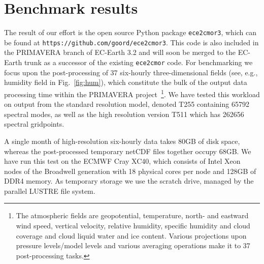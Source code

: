 \documentclass[procedia]{easychair}
\begin{document}
\section{Benchmark results}
The result of our effort is the open source Python package \texttt{ece2cmor3}, 
which can be found at \texttt{https://github.com/goord/ece2cmor3}. This code is 
also included in the PRIMAVERA branch of EC-Earth 3.2 and will soon be merged 
to the EC-Earth trunk as a successor of the existing \texttt{ece2cmor} code. 
For benchmarking we focus upon the post-processing of 37 six-hourly 
three-dimensional fields (see, e.g., humidity field in Fig.~\ref{fig:hum}), 
which constitute the bulk of the output data 
processing time within the PRIMAVERA project~\footnote{The atmospheric fields 
are geopotential, temperature, north- and eastward wind speed, vertical 
velocity, relative humidity, specific humidity and cloud coverage and cloud 
liquid water and ice content. Various projections upon pressure levels/model 
levels and various averaging operations make it to 37 post-processing tasks.}. 
We have tested this workload on output from the standard resolution model, 
denoted T255 containing 65792 spectral modes, as well as the high resolution 
version T511 which has 262656 spectral gridpoints.
  
A single month of high-resolution six-hourly data takes 80GB of disk space, 
whereas the post-processed temporary netCDF files together occupy 68GB. We have 
run this test on the ECMWF Cray XC40, which consists of Intel Xeon nodes of the 
Broadwell generation with 18 physical cores per node and 128GB of DDR4 memory. 
As temporary storage we use the scratch drive, managed by the parallel LUSTRE 
file system.
\end{document}
